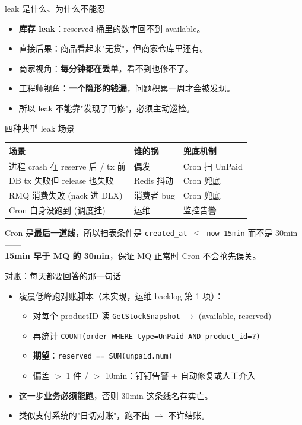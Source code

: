\begin{frame}{leak 是什么、为什么不能忍}
\begin{itemize}
  \item \textbf{库存 leak}：reserved 桶里的数字回不到 available。
  \item 直接后果：商品看起来"无货"，但商家仓库里还有。
  \item 商家视角：\textbf{每分钟都在丢单}，看不到也修不了。
  \item 工程师视角：\textbf{一个隐形的钱漏}，问题积累一周才会被发现。
  \item 所以 leak 不能靠"发现了再修"，必须主动巡检。
\end{itemize}
\end{frame}

\begin{frame}{四种典型 leak 场景}
\begin{tabular}{@{}lll@{}}
\toprule
场景 & 谁的锅 & 兜底机制 \\
\midrule
进程 crash 在 reserve 后 / tx 前 & 偶发 & Cron 扫 UnPaid \\
DB tx 失败但 release 也失败       & Redis 抖动 & Cron 兜底 \\
RMQ 消费失败 (nack 进 DLX)        & 消费者 bug & Cron 兜底 \\
Cron 自身没跑到 (调度挂)          & 运维 & 监控告警 \\
\bottomrule
\end{tabular}
\vspace{2mm}
\small Cron 是\textbf{最后一道线}，所以扫表条件是 \texttt{created\_at $\le$ now-15min} 而不是 30min ——\\
\textbf{15min 早于 MQ 的 30min}，保证 MQ 正常时 Cron 不会抢先误关。
\end{frame}

\begin{frame}{对账：每天都要回答的那一句话}
\begin{itemize}
  \item 凌晨低峰跑对账脚本（未实现，运维 backlog 第 1 项）：
  \begin{itemize}
    \item 对每个 productID 读 \texttt{GetStockSnapshot} $\to$ (available, reserved)
    \item 再统计 \texttt{COUNT(order WHERE type=UnPaid AND product\_id=?)}
    \item \textbf{期望}：\texttt{reserved == SUM(unpaid.num)}
    \item 偏差 $>$ 1 件 / $>$ 10min：钉钉告警 + 自动修复或人工介入
  \end{itemize}
  \item 这一步\textbf{业务必须能跑}，否则 30min 这条线名存实亡。
  \item 类似支付系统的"日切对账"，跑不出 $\to$ 不许结账。
\end{itemize}
\end{frame}

